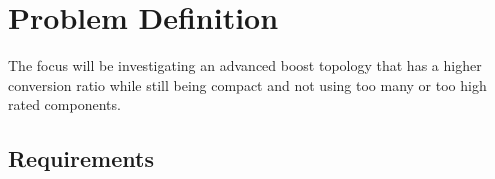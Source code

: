 \chapter{Problem Definition}\label{ch:probdesc}
The focus will be investigating an advanced boost topology that has a higher conversion ratio while still being compact and not using too many or too high rated components.



\section{Requirements}

